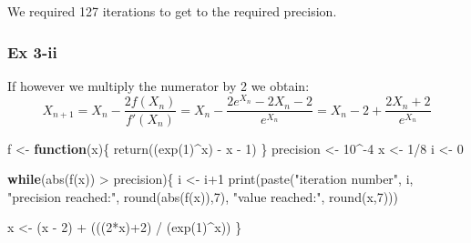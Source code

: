 \documentclass[
]{article}
\newenvironment{Shaded}{\begin{snugshade}}{\end{snugshade}}
\newcommand{\ControlFlowTok}[1]{\textcolor[rgb]{0.13,0.29,0.53}{\textbf{#1}}}
\newcommand{\DecValTok}[1]{\textcolor[rgb]{0.00,0.00,0.81}{#1}}
\newcommand{\FunctionTok}[1]{\textcolor[rgb]{0.00,0.00,0.00}{#1}}
\newcommand{\NormalTok}[1]{#1}
\newcommand{\OtherTok}[1]{\textcolor[rgb]{0.56,0.35,0.01}{#1}}
\newcommand{\SpecialCharTok}[1]{\textcolor[rgb]{0.00,0.00,0.00}{#1}}
\newcommand{\StringTok}[1]{\textcolor[rgb]{0.31,0.60,0.02}{#1}}
\begin{document}
We required 127 iterations to get to the required precision.

\hypertarget{ex-3-ii}{%
\subsubsection{Ex 3-ii}\label{ex-3-ii}}

If however we multiply the numerator by 2 we obtain: \[
    X_{n+1} = X_{n} - \frac{2f(X_n)}{f'(X_n)} = X_n -\frac{2e^{X_n} - 2X_n - 2}{e^{X_n}} = X_n - 2 + \frac{2X_n + 2}{e^{X_n}}
\]

\begin{Shaded}
\begin{Highlighting}[]
\NormalTok{f }\OtherTok{\textless{}{-}} \ControlFlowTok{function}\NormalTok{(x)\{}
  \FunctionTok{return}\NormalTok{((}\FunctionTok{exp}\NormalTok{(}\DecValTok{1}\NormalTok{)}\SpecialCharTok{\^{}}\NormalTok{x) }\SpecialCharTok{{-}}\NormalTok{ x }\SpecialCharTok{{-}} \DecValTok{1}\NormalTok{)}
\NormalTok{\}}
\NormalTok{precision }\OtherTok{\textless{}{-}} \DecValTok{10}\SpecialCharTok{\^{}{-}}\DecValTok{4}
\NormalTok{x }\OtherTok{\textless{}{-}} \DecValTok{1}\SpecialCharTok{/}\DecValTok{8}
\NormalTok{i }\OtherTok{\textless{}{-}} \DecValTok{0}

\ControlFlowTok{while}\NormalTok{(}\FunctionTok{abs}\NormalTok{(}\FunctionTok{f}\NormalTok{(x)) }\SpecialCharTok{\textgreater{}}\NormalTok{ precision)\{}
\NormalTok{  i }\OtherTok{\textless{}{-}}\NormalTok{ i}\SpecialCharTok{+}\DecValTok{1}
  \FunctionTok{print}\NormalTok{(}\FunctionTok{paste}\NormalTok{(}\StringTok{"iteration number"}\NormalTok{, i, }\StringTok{"precision reached:"}\NormalTok{, }\FunctionTok{round}\NormalTok{(}\FunctionTok{abs}\NormalTok{(}\FunctionTok{f}\NormalTok{(x)),}\DecValTok{7}\NormalTok{), }\StringTok{"value reached:"}\NormalTok{, }\FunctionTok{round}\NormalTok{(x,}\DecValTok{7}\NormalTok{)))}

\NormalTok{  x }\OtherTok{\textless{}{-}}\NormalTok{ (x }\SpecialCharTok{{-}} \DecValTok{2}\NormalTok{) }\SpecialCharTok{+}\NormalTok{ (((}\DecValTok{2}\SpecialCharTok{*}\NormalTok{x)}\SpecialCharTok{+}\DecValTok{2}\NormalTok{) }\SpecialCharTok{/}\NormalTok{ (}\FunctionTok{exp}\NormalTok{(}\DecValTok{1}\NormalTok{)}\SpecialCharTok{\^{}}\NormalTok{x))}
\NormalTok{\}}
\end{Highlighting}
\end{Shaded}
\end{document}
